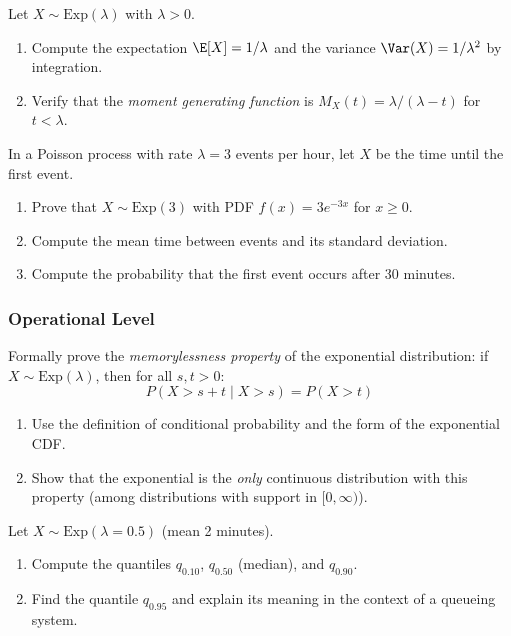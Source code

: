 \begin{problema}
	\label{prob:4.5.2}
	Let $X \sim \text{Exp}(\lambda)$ with $\lambda > 0$.
	\begin{enumerate}
		\item Compute the expectation $\E[X] = 1/\lambda$ and the variance $\Var(X) = 1/\lambda^{2}$ by integration.
		\item Verify that the \emph{moment generating function} is $M_{X}(t) = \lambda/(\lambda - t)$ for $t < \lambda$.
	\end{enumerate}
\end{problema}

\begin{problema}
	\label{prob:4.5.3}
	In a Poisson process with rate $\lambda = 3$ events per hour, let $X$ be the time until the first event.
	\begin{enumerate}
		\item Prove that $X \sim \text{Exp}(3)$ with PDF $f(x) = 3e^{-3x}$ for $x \ge 0$.
		\item Compute the mean time between events and its standard deviation.
		\item Compute the probability that the first event occurs after 30 minutes.
	\end{enumerate}
\end{problema}

\subsubsection*{Operational Level}

\begin{problema}
	\label{prob:4.5.4}
	Formally prove the \emph{memorylessness property} of the exponential distribution: if $X \sim \text{Exp}(\lambda)$, then for all $s, t > 0$:
	$$P(X > s + t \mid X > s) = P(X > t)$$
	\begin{enumerate}
		\item Use the definition of conditional probability and the form of the exponential CDF.
		\item Show that the exponential is the \emph{only} continuous distribution with this property (among distributions with support in $[0, \infty)$).
	\end{enumerate}
\end{problema}

\begin{problema}
	\label{prob:4.5.5}
	Let $X \sim \text{Exp}(\lambda = 0.5)$ (mean 2 minutes).
	\begin{enumerate}
		\item Compute the quantiles $q_{0.10}$, $q_{0.50}$ (median), and $q_{0.90}$.
		\item Find the quantile $q_{0.95}$ and explain its meaning in the context of a queueing system.
	\end{enumerate}
\end{problema}

